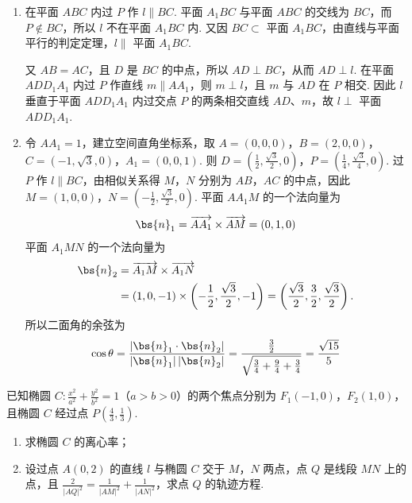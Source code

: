 \begin{solution}
\begin{enumerate}
\item 在平面 \(ABC\) 内过 \(P\) 作 \(l\parallel BC\). 平面 \(A_1BC\) 与平面 \(ABC\) 的交线为 \(BC\)，而 \(P\notin BC\)，所以 \(l\) 不在平面 \(A_1BC\) 内. 又因 \(BC\subset\) 平面 \(A_1BC\)，由直线与平面平行的判定定理，\(l\parallel\) 平面 \(A_1BC\).

又 \(AB=AC\)，且 \(D\) 是 \(BC\) 的中点，所以 \(AD\perp BC\)，从而 \(AD\perp l\). 在平面 \(ADD_1A_1\) 内过 \(P\) 作直线 \(m\parallel AA_1\)，则 \(m\perp l\)，且 \(m\) 与 \(AD\) 在 \(P\) 相交. 因此 \(l\) 垂直于平面 \(ADD_1A_1\) 内过交点 \(P\) 的两条相交直线 \(AD\)、\(m\)，故 \(l\perp\) 平面 \(ADD_1A_1\).

\item 令 \(AA_1=1\)，建立空间直角坐标系，取
\(A=(0,0,0)\)，\(B=(2,0,0)\)，\(C=(-1,\sqrt3,0)\)，\(A_1=(0,0,1)\).
则 \(D=(\frac12,\frac{\sqrt3}{2},0)\)，\(P=(\frac14,\frac{\sqrt3}{4},0)\). 过 \(P\) 作 \(l\parallel BC\)，由相似关系得 \(M\)，\(N\) 分别为 \(AB\)，\(AC\) 的中点，因此
\(M=(1,0,0)\)，\(N=\left(-\frac12,\frac{\sqrt3}{2},0\right)\).
平面 \(AA_1M\) 的一个法向量为
\[
\bs{n}_1=\overrightarrow{AA_1}\times\overrightarrow{AM}=(0,1,0)
\]
平面 \(A_1MN\) 的一个法向量为
\[
\begin{aligned}
\bs{n}_2
&=\overrightarrow{A_1M}\times\overrightarrow{A_1N}\\
&=(1,0,-1)\times\left(-\frac12,\frac{\sqrt3}{2},-1\right)
=\left(\frac{\sqrt3}{2},\frac32,\frac{\sqrt3}{2}\right).
\end{aligned}
\]
所以二面角的余弦为
\[
\cos\theta=\frac{|\bs{n}_1\cdot\bs{n}_2|}{|\bs{n}_1|\,|\bs{n}_2|}
=\frac{\frac32}{\sqrt{\frac34+\frac94+\frac34}}
=\frac{\sqrt{15}}5
\]
\end{enumerate}
\end{solution}

\begin{problem}
已知椭圆 \(C: \frac{x^2}{a^2} + \frac{y^2}{b^2} = 1\)（\(a>b>0\)）的两个焦点分别为 \(F_1(-1,0)\)，\(F_2(1,0)\)，且椭圆 \(C\) 经过点 \(P\left(\frac{4}{3}, \frac{1}{3}\right)\).
\begin{enumerate}
\item 求椭圆 \(C\) 的离心率；
\item 设过点 \(A(0,2)\) 的直线 \(l\) 与椭圆 \(C\) 交于 \(M\)，\(N\) 两点，点 \(Q\) 是线段 \(MN\) 上的点，且 \(\frac{2}{|AQ|^2} = \frac{1}{|AM|^2} + \frac{1}{|AN|^2}\)，求点 \(Q\) 的轨迹方程.
\end{enumerate}
\end{problem}

